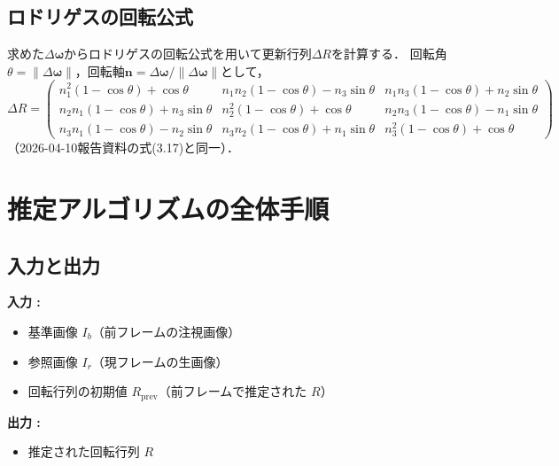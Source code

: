 \documentclass{ltjsarticle}          %
\begin{document}
\subsection{ロドリゲスの回転公式}
求めた$\Delta\bm{\omega}$からロドリゲスの回転公式を用いて更新行列$\Delta R$を計算する．
回転角$\theta = \|\Delta\bm{\omega}\|$，回転軸$\bm{n} = \Delta\bm{\omega}/\|\Delta\bm{\omega}\|$として，
\begin{equation}
  \Delta R =
  \begin{pmatrix}
    n_1^2(1-\cos\theta) + \cos\theta & n_1 n_2(1-\cos\theta) - n_3\sin\theta & n_1 n_3(1-\cos\theta) + n_2\sin\theta \\
    n_2 n_1(1-\cos\theta) + n_3\sin\theta & n_2^2(1-\cos\theta) + \cos\theta & n_2 n_3(1-\cos\theta) - n_1\sin\theta \\
    n_3 n_1(1-\cos\theta) - n_2\sin\theta & n_3 n_2(1-\cos\theta) + n_1\sin\theta & n_3^2(1-\cos\theta) + \cos\theta
  \end{pmatrix}
  \label{eq:rodrigues}
\end{equation}
（2026-04-10報告資料の式(3.17)と同一）．

\section{推定アルゴリズムの全体手順}
\subsection{入力と出力}
\noindent
\textbf{入力 : }
\begin{itemize}
  \item 基準画像 $I_b$（前フレームの注視画像）
  \item 参照画像 $I_r$（現フレームの生画像）
  \item 回転行列の初期値 $R_{\mathrm{prev}}$（前フレームで推定された $R$）
\end{itemize}

\noindent
\textbf{出力 : }
\begin{itemize}
  \item 推定された回転行列 $R$
\end{itemize}
\end{document}

